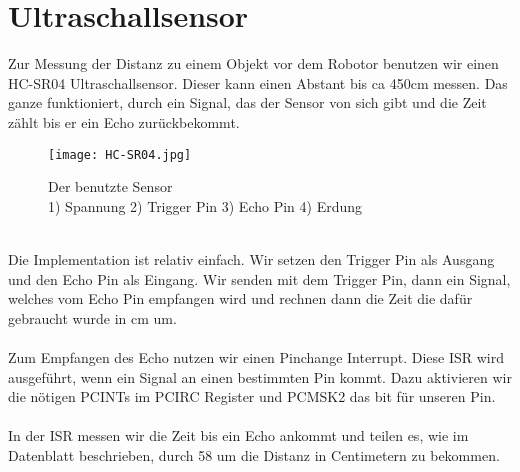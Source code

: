 \documentclass[12pt]{article}
\begin{document}
\section{Ultraschallsensor} %
Zur Messung der Distanz zu einem Objekt vor dem Robotor benutzen wir einen HC-SR04 Ultraschallsensor. Dieser kann einen Abstant bis ca 450cm messen. Das ganze funktioniert, durch ein Signal, das der Sensor von sich gibt und die Zeit zählt bis er ein Echo zurückbekommt.\\
\begin{figure}[h]
	\texttt{[image: HC-SR04.jpg]}
	\centering
	\caption{Der benutzte Sensor \\1) Spannung 2) Trigger Pin 3) Echo Pin 4) Erdung}
\end{figure} 
\\
Die Implementation ist relativ einfach. Wir setzen den Trigger Pin als Ausgang und den Echo Pin als Eingang. Wir senden mit dem Trigger Pin, dann ein Signal, welches vom Echo Pin empfangen wird und rechnen dann die Zeit die dafür gebraucht wurde in cm um.\\
\\
Zum Empfangen des Echo nutzen wir einen Pinchange Interrupt. Diese ISR wird ausgeführt, wenn ein Signal an einen bestimmten Pin kommt. Dazu aktivieren wir die nötigen PCINTs im PCIRC Register und PCMSK2 das bit für unseren Pin.\\
\\
In der ISR messen wir die Zeit bis ein Echo ankommt und teilen es, wie im Datenblatt beschrieben, durch 58 um die Distanz in Centimetern zu bekommen.
\end{document}
